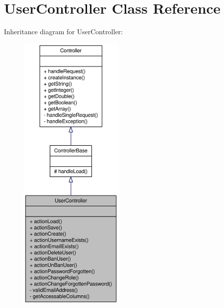 \hypertarget{classUserController}{
\section{UserController Class Reference}
\label{classUserController}
}


Inheritance diagram for UserController:\nopagebreak
\begin{figure}[H]
\begin{center}
\leavevmode
\includegraphics[height=400pt]{classUserController__inherit__graph}
\end{center}
\end{figure}


